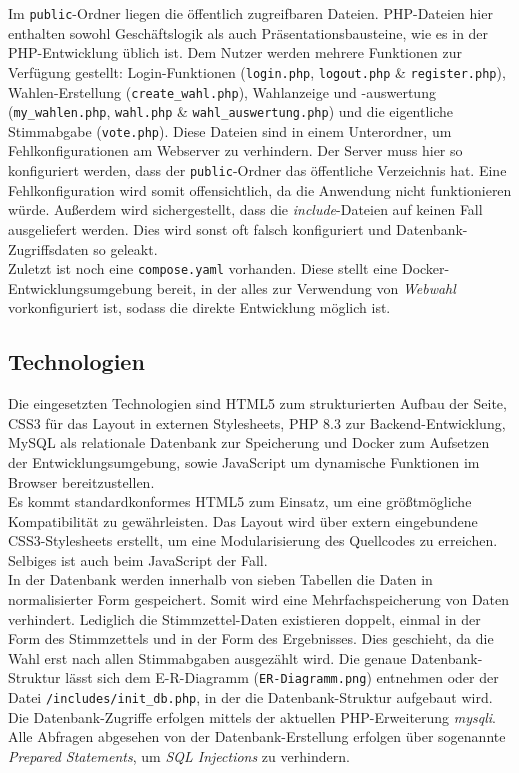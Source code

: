 \documentclass[a4paper]{scrartcl}
\newcommand{\file}[1]{\texttt{#1}}
\begin{document}
	\noindent Im \file{public}-Ordner liegen die öffentlich zugreifbaren Dateien. PHP-Dateien hier enthalten sowohl Geschäftslogik als auch Präsentationsbausteine, wie es in der PHP-Entwicklung üblich ist. Dem Nutzer werden mehrere Funktionen zur Verfügung gestellt: Login-Funktionen (\file{login.php}, \file{logout.php} \& \file{register.php}), Wahlen-Erstellung (\file{create\_wahl.php}), Wahlanzeige und -auswertung (\file{my\_wahlen.php}, \file{wahl.php} \& \file{wahl\_auswertung.php}) und die eigentliche Stimmabgabe (\file{vote.php}). Diese Dateien sind in einem Unterordner, um Fehlkonfigurationen am Webserver zu verhindern. Der Server muss hier so konfiguriert werden, dass der \file{public}-Ordner das öffentliche Verzeichnis hat. Eine Fehlkonfiguration wird somit offensichtlich, da die Anwendung nicht funktionieren würde. Außerdem wird sichergestellt, dass die \textit{include}-Dateien auf keinen Fall ausgeliefert werden. Dies wird sonst oft falsch konfiguriert und Datenbank-Zugriffsdaten so geleakt.\\
	
	\noindent Zuletzt ist noch eine \file{compose.yaml} vorhanden. Diese stellt eine Docker-Entwicklungsumgebung bereit, in der alles zur Verwendung von \textit{Webwahl} vorkonfiguriert ist, sodass die direkte Entwicklung möglich ist.
	
	\subsection{Technologien}
	Die eingesetzten Technologien sind HTML5 zum strukturierten Aufbau der Seite, CSS3 für das Layout in externen Stylesheets, PHP 8.3 zur Backend-Entwicklung, MySQL als relationale Datenbank zur Speicherung und Docker zum Aufsetzen der Entwicklungsumgebung, sowie JavaScript um dynamische Funktionen im Browser bereitzustellen.\\
	
	\noindent Es kommt standardkonformes HTML5 zum Einsatz, um eine größtmögliche Kompatibilität zu gewährleisten. Das Layout wird über extern eingebundene CSS3-Stylesheets erstellt, um eine Modularisierung des Quellcodes zu erreichen. Selbiges ist auch beim JavaScript der Fall.\\
	
	\noindent In der Datenbank werden innerhalb von sieben Tabellen die Daten in normalisierter Form gespeichert. Somit wird eine Mehrfachspeicherung von Daten verhindert. Lediglich die Stimmzettel-Daten existieren doppelt, einmal in der Form des Stimmzettels und in der Form des Ergebnisses. Dies geschieht, da die Wahl erst nach allen Stimmabgaben ausgezählt wird.
	Die genaue Datenbank-Struktur lässt sich dem E-R-Diagramm (\file{ER-Diagramm.png}) entnehmen oder der Datei \file{/includes/init\_db.php}, in der die Datenbank-Struktur aufgebaut wird.
	Die Datenbank-Zugriffe erfolgen mittels der aktuellen PHP-Erweiterung \textit{mysqli}. Alle Abfragen abgesehen von der Datenbank-Erstellung erfolgen über sogenannte \textit{Prepared Statements}, um \textit{SQL Injections} zu verhindern. \\
	
\end{document}
